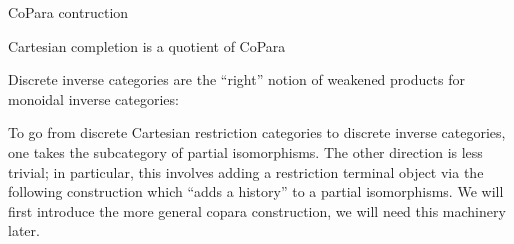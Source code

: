 \begin{definition}
CoPara contruction
\end{definition}

Cartesian completion is a quotient of CoPara 





Discrete inverse categories are the ``right'' notion of weakened products for monoidal inverse categories:

To go from  discrete Cartesian restriction categories to discrete inverse categories, one takes the subcategory of partial isomorphisms.
The other direction is less trivial; in particular, this involves adding a restriction terminal object via the following construction which ``adds a history'' to a partial isomorphisms.  We will first introduce the more general copara construction, we will need this machinery later.


